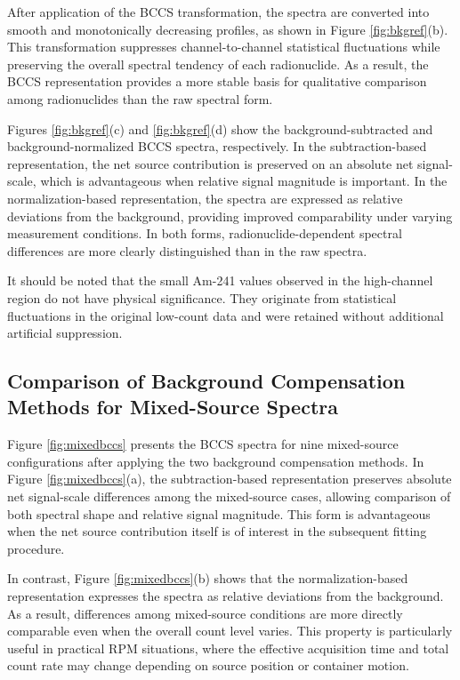 \documentclass[fleqn, 10pt]{wlscirep}
\begin{document}
After application of the BCCS transformation, the spectra are converted into smooth and monotonically decreasing profiles, as shown in Figure \ref{fig:bkgref}(b). This transformation suppresses channel-to-channel statistical fluctuations while preserving the overall spectral tendency of each radionuclide. As a result, the BCCS representation provides a more stable basis for qualitative comparison among radionuclides than the raw spectral form.

Figures \ref{fig:bkgref}(c) and \ref{fig:bkgref}(d) show the background-subtracted and background-normalized BCCS spectra, respectively. In the subtraction-based representation, the net source contribution is preserved on an absolute net signal-scale, which is advantageous when relative signal magnitude is important. In the normalization-based representation, the spectra are expressed as relative deviations from the background, providing improved comparability under varying measurement conditions. In both forms, radionuclide-dependent spectral differences are more clearly distinguished than in the raw spectra.

It should be noted that the small Am-241 values observed in the high-channel region do not have physical significance. They originate from statistical fluctuations in the original low-count data and were retained without additional artificial suppression.

\subsection*{Comparison of Background Compensation Methods for Mixed-Source Spectra}

Figure \ref{fig:mixedbccs} presents the BCCS spectra for nine mixed-source configurations after applying the two background compensation methods. In Figure \ref{fig:mixedbccs}(a), the subtraction-based representation preserves absolute net signal-scale differences among the mixed-source cases, allowing comparison of both spectral shape and relative signal magnitude. This form is advantageous when the net source contribution itself is of interest in the subsequent fitting procedure.

In contrast, Figure \ref{fig:mixedbccs}(b) shows that the normalization-based representation expresses the spectra as relative deviations from the background. As a result, differences among mixed-source conditions are more directly comparable even when the overall count level varies. This property is particularly useful in practical RPM situations, where the effective acquisition time and total count rate may change depending on source position or container motion.
\end{document}
